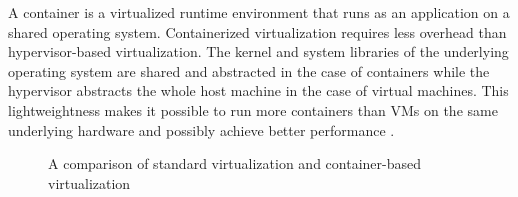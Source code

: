 A container is a virtualized runtime environment that runs as an application on a shared operating system. Containerized virtualization requires less overhead than hypervisor-based virtualization. The kernel and system libraries of the underlying operating system are shared and abstracted in the case of containers while the hypervisor abstracts the whole host machine in the case of virtual machines. This lightweightness makes it possible to run more containers than VMs on the same underlying hardware and possibly achieve better performance \cite{xavier2013performance}.
\\
\begin{figure}[h!]
	 \hfill
\caption{A comparison of standard virtualization and container-based virtualization}
\label{request-headers}
\end{figure}

